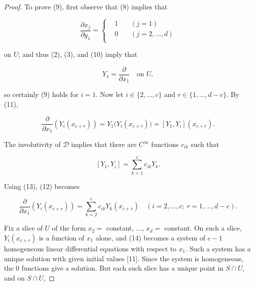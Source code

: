 \begin{proof}
	To prove (9), first observe that (8) implies that

	\begin{equation}
		\tag{10}\label{eq:1.60:10}
		\frac{\partial x_{j}}{\partial y_{1}}=\left\{\begin{aligned}{}&{{}1\quad}&{(j=1)}\\ {}&{{}0\quad}&{(j=2,\ldots,d)}\\ \end{aligned}\right.
	\end{equation}

	on $U$; and thus (2), (3), and (10) imply that

	\begin{equation}
		\tag{11}\label{eq:1.60:11}
		Y_{1}=\frac{\partial}{\partial x_{1}}\quad\text{on }U,
	\end{equation}

	so certainly (9) holds for $i = 1$. Now let $i \in \{2, \ldots, c\}$ and $r \in \{1, \ldots, d - c\}$. By (11),

	\begin{equation}
		\tag{12}\label{eq:1.60:12}
		\frac{\partial}{\partial x_{1}}\left(Y_{i}(x_{c+r})\right)=Y_{1}\big(Y_{i}(x_{c+r})\big)=[Y_{1},Y_{i}](x_{c+r}).
	\end{equation}

	The involutivity of $\mathcal{D}$ implies that there are $C^{\infty}$ functions $c_{ik}$ such that

	\begin{equation}
		\tag{13}\label{eq:1.60:13}
		[Y_{1},Y_{i}]=\sum_{k=1}^{c}c_{i k}Y_{k}.
	\end{equation}

	Using (13), (12) becomes

	\begin{equation}
		\tag{14}\label{eq:1.60:14}
		\frac{\partial}{\partial x_{1}}\left(Y_{i}(x_{c+r})\right)=\sum_{k=2}^{c}c_{i k}Y_{k}(x_{c+r})\quad(i=2,\ldots,c;\ r=1,\ldots,d-c).
	\end{equation}

	\begin{center}
	\end{center}

	Fix a slice of $U$ of the form $x_{2}=$ constant, ..., $x_{d}=$ constant. On such a slice, $Y_{i}(x_{c+r})$ is a function of $x_{1}$ alone, and (14) becomes a system of $c-1$ homogeneous linear differential equations with respect to $x_{1}$. Such a system has a unique solution with given initial values [11]. Since the system is homogeneous, the 0 functions give a solution. But each such slice has a unique point in $S\cap U$, and on $S\cap U$,


\end{proof}
